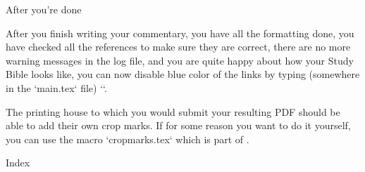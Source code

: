 {{\sec After you're done

After you finish writing your commentary, you have all the formatting done, 
you have checked all the references to make sure they are correct, 
there are no more warning messages in the log file, 
and you are quite happy about how your Study Bible looks like, you can now disable blue color of the 
links by typing (somewhere in the `main.tex` file) `\hyperlinks\relax\relax`.

The printing house to which you would submit your resulting PDF should be able to add their own 
crop marks. If for some reason you want to do it yourself, you can use the macro `cropmarks.tex` which is part of .




\sec Index

\def\_sortinglang{en}
\typosize[9/]
\makeindex
\endmulti

\bye












































































}}
